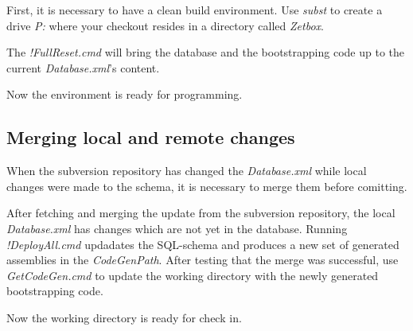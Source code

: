 First, it is necessary to have a clean build environment. Use
\emph{subst} to create a drive \emph{P:} where your checkout
resides in a directory called \emph{Zetbox}.

The \emph{!FullReset.cmd} will bring the database and the bootstrapping
code up to the current \emph{Database.xml}'s content.

Now the environment is ready for programming.

\subsection{Merging local and remote changes}

When the subversion repository has changed the \emph{Database.xml} while
local changes were made to the schema, it is necessary to merge them
before comitting.

After fetching and merging the update from the subversion repository,
the local \emph{Database.xml} has changes which are not yet in the
database. Running \emph{!DeployAll.cmd} updadates the SQL-schema and
produces a new set of generated assemblies in the \emph{CodeGenPath}.
After testing that the merge was successful, use \emph{GetCodeGen.cmd}
to update the working directory with the newly generated bootstrapping
code.

Now the working directory is ready for check in.



